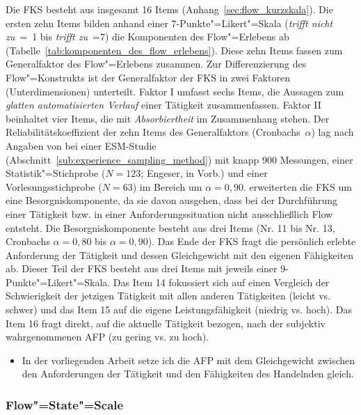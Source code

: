 Die \ac{FKS} besteht aus insgesamt 16 Items (Anhang~\ref{sec:flow_kurzskala}). Die ersten zehn Items bilden anhand einer 7-Punkte"=Likert"=Skala (\emph{trifft nicht zu}~=~1 bis \emph{trifft zu}~=7) die Komponenten des Flow"=Erlebens ab (Tabelle~\ref{tab:komponenten_des_flow_erlebens}). Diese zehn Items fassen \citet{Rheinberg2003} zum Generalfaktor des Flow"=Erlebens zusammen. Zur Differenzierung des Flow"=Konstrukts ist der Generalfaktor der \ac{FKS} in zwei Faktoren (Unterdimensionen) unterteilt. Faktor I umfasst sechs Items, die Aussagen zum \emph{glatten automatisierten Verlauf} einer Tätigkeit zusammenfassen. Faktor II beinhaltet vier Items, die mit \emph{Absorbiertheit} im Zusammenhang stehen. Der Reliabilitätskoeffizient der zehn Items des Generalfaktors (Cronbachs~$\alpha$) lag nach Angaben von \citet[S.~9]{Rheinberg2003} bei einer \ac{ESM}-Studie (Abschnitt~\ref{sub:experience_sampling_method}) mit knapp 900 Messungen, einer Statistik"=Stichprobe ($N = 123$; Engeser, in Vorb.) und einer Vorlesungsstichprobe ($N = 63$) im Bereich um $\alpha = 0{,}90$. \citet{Rheinberg2003} erweiterten die \ac{FKS} um eine Besorgniskomponente, da sie davon ausgehen, dass bei der Durchführung einer Tätigkeit bzw. in einer Anforderungssituation nicht ausschließlich Flow entsteht. Die Besorgniskomponente besteht aus drei Items (Nr. 11 bis Nr. 13, Cronbachs $\alpha = 0{,}80$ bis $\alpha = 0{,}90$). Das Ende der \ac{FKS} fragt die persönlich erlebte Anforderung der Tätigkeit und dessen Gleichgewicht mit den eigenen Fähigkeiten ab. Dieser Teil der \ac{FKS} besteht aus drei Items mit jeweils einer 9-Punkte"=Likert"=Skala. Das Item 14 fokussiert sich auf einen Vergleich der Schwierigkeit der jetzigen Tätigkeit mit allen anderen Tätigkeiten (leicht vs. schwer) und das Item 15 auf die eigene Leistungsfähigkeit (niedrig vs. hoch). Das Item 16 fragt direkt, auf die aktuelle Tätigkeit bezogen, nach der subjektiv wahrgenommenen \ac{AFP} (zu gering vs. zu hoch). 
\begin{itemize}
	
	\item In der vorliegenden Arbeit setze ich die \ac{AFP} mit dem Gleichgewicht zwischen den Anforderungen der Tätigkeit und den Fähigkeiten des Handelnden gleich. 
\end{itemize}

\subsubsection{Flow"=State"=Scale} 

